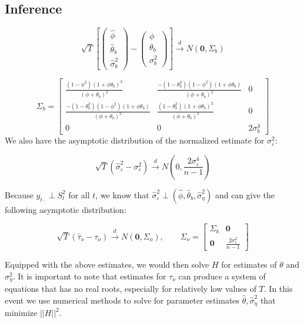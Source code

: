 \subsection{Inference}





$$\sqrt{T}\left[\left(\begin{array}{c}
     \hat{\phi}  \\
     \hat{\theta}_b \\
     \hat{\sigma}_b^2   
\end{array}\right) - \left(\begin{array}{c}
     {\phi}  \\
     {\theta}_b \\
     {\sigma}_b^2
\end{array}\right)\right] \xrightarrow{d}N(\mathbf{0}, \Sigma_b)$$

$$\Sigma_b = \left[ \begin{array}{ccc}
    \frac{(1 - \phi^2)(1 + \phi\theta_b)^2}{(\phi + \theta_b)^2} & \frac{-(1 - \theta_b^2)(1 - \phi^2)(1 + \phi\theta_b)}{(\phi + \theta_b)^2} & 0 \\
    \frac{-(1 - \theta_b^2)(1 - \phi^2)(1 + \phi\theta_b)}{(\phi + \theta_b)^2} & \frac{(1 - \theta_b^2)(1 + \phi\theta_b)^2}{(\phi + \theta_b)^2} & 0 \\
    0 & 0 & 2\sigma_b^4
\end{array} \right] $$
We also have the asymptotic distribution of the normalized estimate for $\sigma_\varepsilon^2$:

$$\sqrt{T}(\hat{\sigma}_\varepsilon^2 - \sigma_\varepsilon^2) \xrightarrow{d}N(0,\frac{2\sigma_\varepsilon^4}{n-1})$$ 

Because ${y}_{t\cdot} \perp S_t^2$ for all $t$, we know that $\hat{\sigma}_\varepsilon^2 \perp (\hat{\phi},\hat{\theta}_b,\hat{\sigma}_\eta^2)$ and can give the following asymptotic distribution:

\begin{equation}
    \sqrt{T}(\hat{\tau}_o - \tau_o) \xrightarrow{d} N(\mathbf{0},\Sigma_o), \qquad  \Sigma_o = \left[\begin{array}{cc}
        \Sigma_b & \mathbf{0} \\
        \mathbf{0} & \frac{2\sigma_\varepsilon^2}{n-1}
    \end{array}\right]
    \label{eq:Sigma_o}
\end{equation}


Equipped with the above estimates, we would then solve $H$ for estimates of $\theta$ and $\sigma_\eta^2$. It is important to note that estimates for $\tau_o$ can produce a system of equations that has no real roots, especially for relatively low values of $T$. In this event we use numerical methods to solve for parameter estimates $\hat{\theta},\hat{\sigma}_\eta^2$ that minimize $||H||^2$.

